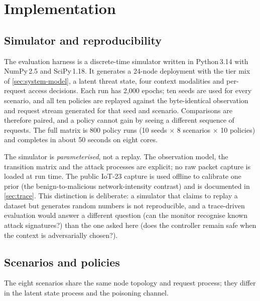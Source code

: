 \section{Implementation}
\label{sec:implementation}

\subsection{Simulator and reproducibility}
\label{sec:sim-implementation}

The evaluation harness is a discrete-time simulator written in Python\,3.14 with
NumPy\,2.5 and SciPy\,1.18. It generates a 24-node deployment with the tier mix
of \cref{sec:system-model}, a latent threat state, four context modalities and
per-request access decisions. Each run has 2{,}000 epochs; ten seeds are used for
every scenario, and all ten policies are replayed against the byte-identical
observation and request stream generated for that seed and scenario. Comparisons
are therefore paired, and a policy cannot gain by seeing a different sequence of
requests. The full matrix is 800 policy runs (10 seeds $\times$ 8 scenarios
$\times$ 10 policies) and completes in about 50 seconds on eight cores.

The simulator is \emph{parameterised}, not a replay. The observation model, the
transition matrix and the attack processes are explicit; no raw packet capture is
loaded at run time. The public IoT-23 capture is used offline to calibrate one
prior (the benign-to-malicious network-intensity contrast) and is documented in
\cref{sec:trace}. This distinction is deliberate: a simulator that claims to
replay a dataset but generates random numbers is not reproducible, and a
trace-driven evaluation would answer a different question (can the monitor
recognise known attack signatures?) than the one asked here (does the controller
remain safe when the context is adversarially chosen?).

\subsection{Scenarios and policies}
\label{sec:scenarios}

The eight scenarios share the same node topology and request process; they
differ in the latent state process and the poisoning channel.

